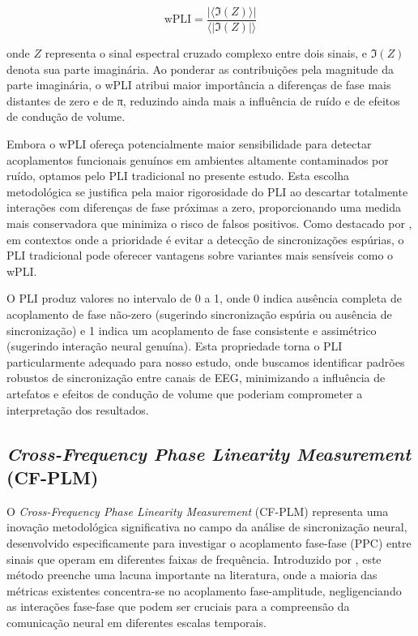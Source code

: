 \[
\text{wPLI} = \frac{|\langle \Im(Z) \rangle|}{\langle |\Im(Z)| \rangle}
\]

onde \(Z\) representa o sinal espectral cruzado complexo entre dois sinais, e \(\Im(Z)\) denota sua parte imaginária. Ao ponderar as contribuições pela magnitude da parte imaginária, o wPLI atribui maior importância a diferenças de fase mais distantes de zero e de π, reduzindo ainda mais a influência de ruído e de efeitos de condução de volume.

Embora o wPLI ofereça potencialmente maior sensibilidade para detectar acoplamentos funcionais genuínos em ambientes altamente contaminados por ruído, optamos pelo PLI tradicional no presente estudo. Esta escolha metodológica se justifica pela maior rigorosidade do PLI ao descartar totalmente interações com diferenças de fase próximas a zero, proporcionando uma medida mais conservadora que minimiza o risco de falsos positivos. Como destacado por , em contextos onde a prioridade é evitar a detecção de sincronizações espúrias, o PLI tradicional pode oferecer vantagens sobre variantes mais sensíveis como o wPLI.

O PLI produz valores no intervalo de 0 a 1, onde 0 indica ausência completa de acoplamento de fase não-zero (sugerindo sincronização espúria ou ausência de sincronização) e 1 indica um acoplamento de fase consistente e assimétrico (sugerindo interação neural genuína). Esta propriedade torna o PLI particularmente adequado para nosso estudo, onde buscamos identificar padrões robustos de sincronização entre canais de EEG, minimizando a influência de artefatos e efeitos de condução de volume que poderiam comprometer a interpretação dos resultados.

\subsection{\textit{Cross-Frequency Phase Linearity Measurement} (CF-PLM)}
O \textit{Cross-Frequency Phase Linearity Measurement} (CF-PLM) representa uma inovação metodológica significativa no campo da análise de sincronização neural, desenvolvido especificamente para investigar o acoplamento fase-fase (PPC) entre sinais que operam em diferentes faixas de frequência. Introduzido por , este método preenche uma lacuna importante na literatura, onde a maioria das métricas existentes concentra-se no acoplamento fase-amplitude, negligenciando as interações fase-fase que podem ser cruciais para a compreensão da comunicação neural em diferentes escalas temporais.

